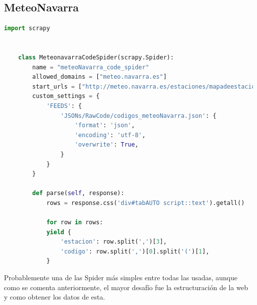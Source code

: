 \subsection{MeteoNavarra}

\begin{lstlisting}[language=Python, caption={MeteoNavarra Code Spider}]
	import scrapy
	
	
	class MeteonavarraCodeSpider(scrapy.Spider):
		name = "meteoNavarra_code_spider"
		allowed_domains = ["meteo.navarra.es"]
		start_urls = ["http://meteo.navarra.es/estaciones/mapadeestaciones.cfm#"]
		custom_settings = {
			'FEEDS': {
				'JSONs/RawCode/codigos_meteoNavarra.json': {
					'format': 'json',
					'encoding': 'utf-8',
					'overwrite': True,
				}
			}
		}
		
		def parse(self, response):
			rows = response.css('div#tabAUTO script::text').getall()
			
			for row in rows:
			yield {
				'estacion': row.split(',')[3],
				'codigo': row.split(',')[0].split('(')[1],
			}
\end{lstlisting}

Probablemente una de las Spider más simples entre todas las usadas, aunque como se comenta anteriormente, el mayor desafío fue la estructuración de la web y como obtener los datos de esta.


